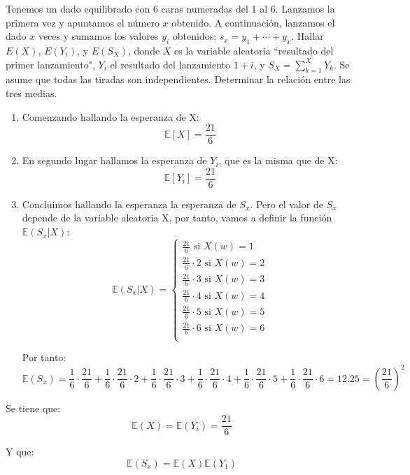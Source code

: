 \begin{problem}[2] Tenemos un dado equilibrado con 6 caras numeradas del 1 al 6. Lanzamos la  primera vez y 
apuntamos el n\'umero $x$ obtenido. A continuaci\'on, 
lanzamos el dado $x$ veces y sumamos los valores $y_i$ obtenidos: $s_x = y_1 + \cdots  + y_x$.
Hallar $E(X)$, $E(Y_i)$, y $E(S_X)$, donde $X$ es la variable aleatoria ``resultado del primer lanzamiento", $Y_i$ el resultado del lanzamiento
$ 1 + i$, y $S_X = \sum_{k = 1}^X Y_k$. Se asume que todas
las tiradas son independientes. 
Determinar la relaci\'on entre las tres medias.

\solution
\begin{enumerate}
\item Comenzando hallando la esperanza de X:
\[
\mathbb{E}[X] = \frac{21}{6}
\]

\item En segundo lugar hallamos la esperanza de $Y_i$, que es la misma que de X:
\[
\mathbb{E}[Y_i] = \frac{21}{6}
\]
\item Concluimos hallando la esperanza la esperanza de $S_x$. Pero el valor de $S_x$ depende de la variable aleatoria X, por tanto, vamos a definir la función $\mathbb{E}(S_x | X)$:
\[
\mathbb{E}(S_x | X) =
  \left\lbrace
  \begin{array}{l}
  	  \frac{21}{6} \text{ si } X(w) = 1\\
  	  \frac{21}{6}\cdot 2 \text{ si } X(w) = 2\\
  	  \frac{21}{6}\cdot 3 \text{ si } X(w) = 3\\
  	  \frac{21}{6}\cdot 4 \text{ si } X(w) = 4\\
  	  \frac{21}{6}\cdot 5 \text{ si } X(w) = 5\\
  	  \frac{21}{6}\cdot 6 \text{ si } X(w) = 6\\
  \end{array}
  \right.
\]

Por tanto:
\[
\mathbb{E}(S_x)=\frac{1}{6}\cdot\frac{21}{6}+\frac{1}{6}\cdot\frac{21}{6}\cdot2+\frac{1}{6}\cdot\frac{21}{6}\cdot3+\frac{1}{6}\cdot\frac{21}{6}\cdot4+\frac{1}{6}\cdot\frac{21}{6}\cdot5+\frac{1}{6}\cdot\frac{21}{6}\cdot6 = 12.25 = (\frac{21}{6})^2
\]
\end{enumerate}

Se tiene que:
\[
\mathbb{E}(X)=\mathbb{E}(Y_i)=\frac{21}{6}
\]

Y que:
\[
\mathbb{E}(S_x)=\mathbb{E}(X)\mathbb{E}(Y_1)
\]

\end{problem}

